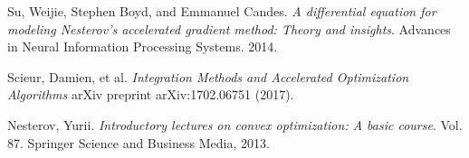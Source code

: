 \begin{thebibliography}{9}
 Su, Weijie, Stephen Boyd, and Emmanuel Candes. \textit{A differential equation for modeling Nesterov’s accelerated gradient method: Theory and insights}. Advances in Neural Information Processing Systems. 2014.

Scieur, Damien, et al. \textit{Integration Methods and Accelerated Optimization Algorithms} arXiv preprint arXiv:1702.06751 (2017).

Nesterov, Yurii. \textit{Introductory lectures on convex optimization: A basic course}. Vol. 87. Springer Science and Business Media, 2013.

\end{thebibliography}

